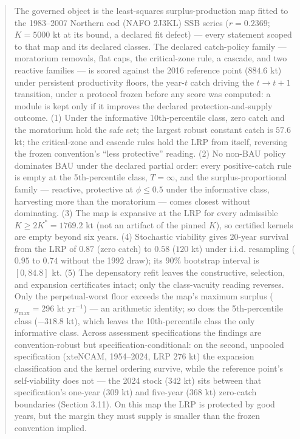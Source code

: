 \documentclass[11pt]{article}
\begin{document}
\begin{abstract}


The governed object is the least-squares surplus-production map fitted
to the 1983--2007 Northern cod (NAFO 2J3KL) SSB series (\(r = 0.2369\);
\(K = 5000\) kt at its bound, a declared fit defect) --- every statement
scoped to that map and its declared classes. The declared catch-policy
family --- moratorium removals, flat caps, the critical-zone rule, a
cascade, and two reactive families --- is scored against the 2016
reference point (\(884.6\) kt) under persistent productivity floors, the
year-\(t\) catch driving the \(t \to t+1\) transition, under a protocol
frozen before any score was computed: a module is kept only if it
improves the declared protection-and-supply outcome. (1) Under the
informative 10th-percentile class, zero catch and the moratorium hold
the safe set; the largest robust constant catch is \(57.6\) kt; the
critical-zone and cascade rules hold the LRP from itself, reversing the
frozen convention's ``less protective'' reading. (2) No non-BAU policy
dominates BAU under the declared partial order: every positive-catch
rule is empty at the 5th-percentile class, \(T=\infty\), and the
surplus-proportional family --- reactive, protective at \(\phi \le 0.5\)
under the informative class, harvesting more than the moratorium ---
comes closest without dominating. (3) The map is expansive at the LRP
for every admissible \(K \ge 2K^* = 1769.2\) kt (not an artifact of the
pinned \(K\)), so certified kernels are empty beyond six years. (4)
Stochastic viability gives 20-year survival from the LRP of \(0.87\)
(zero catch) to \(0.58\) (\(120\) kt) under i.i.d. resampling
(\(0.95\) to \(0.74\) without the 1992 draw); its \(90\%\) bootstrap interval
is \([0, 84.8]\) kt. (5) The depensatory refit leaves the constructive,
selection, and expansion certificates intact; only the class-vacuity
reading reverses. Only the perpetual-worst floor exceeds the map's
maximum surplus (\(g_{\max} = 296\) kt yr\(^{-1}\)) --- an arithmetic
identity; so does the 5th-percentile class (\(-318.8\) kt), which leaves the
10th-percentile class the only informative class.
Across assessment specifications the findings are convention-robust but
specification-conditional: on the second, unpooled specification
(xteNCAM, 1954--2024, LRP \(276\) kt) the expansion classification and
the kernel ordering survive, while the reference point's self-viability
does not --- the 2024 stock (\(342\) kt) sits between that
specification's one-year (\(309\) kt) and five-year (\(368\) kt)
zero-catch boundaries (Section 3.11). On this
map the LRP is protected by good years, but the margin they must supply
is smaller than the frozen convention implied.

\end{abstract}
\end{document}
